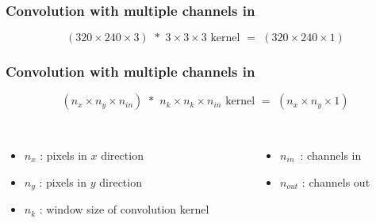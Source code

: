 \documentclass[aspectratio=169,14pt]{beamer}
\begin{document}
\begin{frame}
    \frametitle{Convolution with multiple channels in}
{\normalsize $$ (320 \times 240 \times 3) \,\, * \,\,  3 \times 3 \times 3\text{ kernel} \,\, = \,\, (320 \times 240 \times 1) $$ }
\end{frame}

\begin{frame}
    \frametitle{Convolution with multiple channels in}
{\normalsize $$ (n_x \times n_y \times n_{in}) \,\, * \,\,  n_k \times n_k \times n_{in} \text{ kernel} \,\, = \,\, (n_x \times n_y \times 1) $$ }
~\\
\begin{columns}[t]
    \begin{column}{0.5\textwidth}
        \begin{itemize}
            \item $n_x$ : pixels in $x$ direction
            \item $n_y$ : pixels in $y$ direction
            \item $n_k$ : window size of convolution kernel
        \end{itemize}
    \end{column}
    \begin{column}{0.5\textwidth}
        \begin{itemize}
            \item $n_{in}$ \,: channels in
            \item $n_{out}$ : channels out
        \end{itemize}
    \end{column}
\end{columns}

\end{frame}
\end{document}

